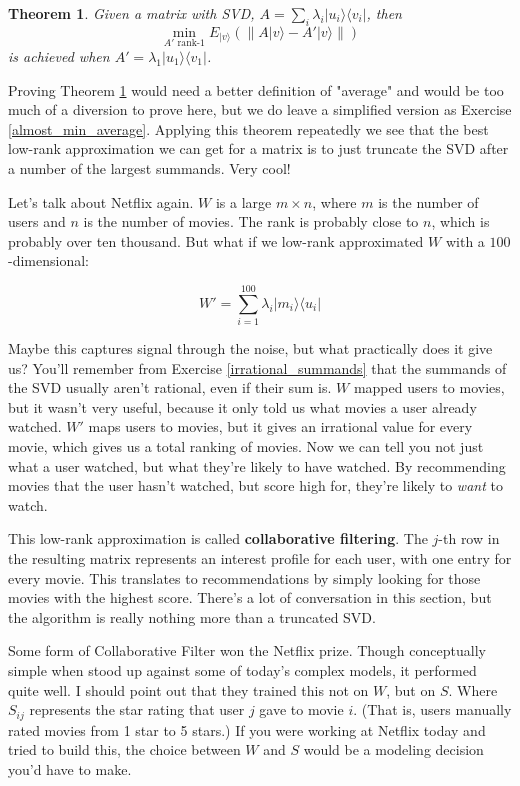 \documentclass{amsbook}
\newtheorem{theorem}{Theorem}
\begin{document}
\begin{theorem}
\label{min_average}
Given a matrix with SVD, $A=\sum_i\lambda_i|u_i\rangle\langle v_i|$, then 
$$
\min_{A'\text{ rank-$1$}}E_{|v\rangle}\left(\left\|A|v\rangle-A'|v\rangle\right\|\right)
$$
is achieved when $A'=\lambda_1|u_1\rangle\langle v_1|$.
\end{theorem}

Proving Theorem \ref{min_average} would need a better definition of "average" and would be too much of a diversion to prove here, but we do leave a simplified version as Exercise \ref{almost_min_average}.  Applying this theorem repeatedly we see that the best low-rank approximation we can get for a matrix is to just truncate the SVD after a number of the largest summands.  Very cool!

Let's talk about Netflix again.  $W$ is a large $m\times n$, where $m$ is the number of users and $n$ is the number of movies.  The rank is probably close to $n$, which is probably over ten thousand.  But what if we low-rank approximated $W$ with a $100$-dimensional:

$$
W'=\sum_{i=1}^{100}\lambda_i|m_i\rangle\langle u_i|
$$

Maybe this captures signal through the noise, but what practically does it give us?  You'll remember from Exercise \ref{irrational_summands} that the summands of the SVD usually aren't rational, even if their sum is.  $W$ mapped users to movies, but it wasn't very useful, because it only told us what movies a user already watched.  $W'$ maps users to movies, but it gives an irrational value for every movie, which gives us a total ranking of movies.  Now we can tell you not just what a user watched, but what they're likely to have watched.  By recommending movies that the user hasn't watched, but score high for, they're likely to {\em want} to watch.

This low-rank approximation is called {\bf collaborative filtering}.  The $j$-th row in the resulting matrix represents an interest profile for each user, with one entry for every movie.  This translates to recommendations by simply looking for those movies with the highest score.  There's a lot of conversation in this section, but the algorithm is really nothing more than a truncated SVD.

Some form of Collaborative Filter won the Netflix prize.  Though conceptually simple when stood up against some of today's complex models, it performed quite well.  I should point out that they trained this not on $W$, but on $S$.  Where $S_{ij}$ represents the star rating that user $j$ gave to movie $i$.  (That is, users manually rated movies from 1 star to 5 stars.)  If you were working at Netflix today and tried to build this, the choice between $W$ and $S$ would be a modeling decision you'd have to make.
\end{document}

